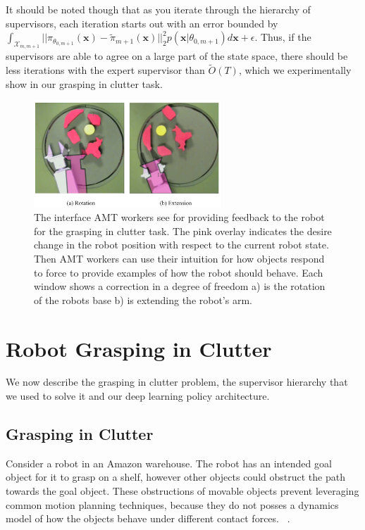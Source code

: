 \documentclass[10pt, conference]{ieeeconf}      %
\begin{document}
It should be noted though that as you iterate through the hierarchy of supervisors, each iteration starts out with an error bounded by $\int_{\mathcal{X}_{m,m+1}} ||\pi_{\theta_{0,m+1}}(\mathbf{x}) - \tilde{\pi}_{m+1}(\mathbf{x})||^2_2 p(\mathbf{x}|\theta_{0,m+1}) d\mathbf{x} + \epsilon$. Thus, if the supervisors are able to agree on a large part of the state space, there should be less iterations with the expert supervisor than $\tilde{O}(T)$, which we experimentally show in our grasping in clutter task. 
 
\begin{figure}[t]
\centering

\includegraphics[width=\columnwidth, height=4cm]{f_figs/labeling.pdf}

\caption{\footnotesize  The interface AMT workers see for providing feedback to the robot for the grasping in clutter task. The pink overlay indicates the desire change in the robot position with respect to the current robot state. Then AMT workers can use their intuition for how objects respond to force to provide examples of how the robot should behave. Each window shows a correction in a degree of freedom a) is the rotation of the robots base b) is extending the robot's arm.}
\vspace*{-10pt}
\label{fig:overlays}
\end{figure}


\section{Robot Grasping in Clutter}
We now describe the grasping in clutter problem, the supervisor hierarchy that we used to solve it and our deep learning policy architecture. 

\subsection{Grasping in Clutter}\label{sec:task}
Consider a robot in an Amazon warehouse. The robot has an intended goal object for it to grasp on a shelf, however other objects could obstruct the path towards the goal object. These obstructions of movable objects prevent leveraging common motion planning techniques, because they do not posses a dynamics model of how the objects behave under different contact forces. ~\cite{kitaevphysics,kingnonprehensile}.
\end{document}

